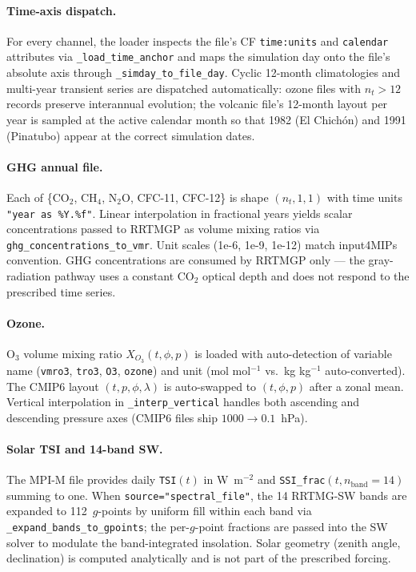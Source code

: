 \documentclass[11pt,twoside]{report}
\begin{document}
\paragraph{Time-axis dispatch.}
For every channel, the loader inspects the file's CF \texttt{time:units}
and \texttt{calendar} attributes via \texttt{\_load\_time\_anchor} and
maps the simulation day onto the file's absolute axis through
\texttt{\_simday\_to\_file\_day}.  Cyclic 12-month climatologies and
multi-year transient series are dispatched automatically:
ozone files with $n_t > 12$ records preserve interannual evolution; the
volcanic file's 12-month layout per year is sampled at the active
calendar month so that 1982 (El Chich\'on) and 1991 (Pinatubo) appear
at the correct simulation dates.

\paragraph{GHG annual file.}
Each of \{CO$_2$, CH$_4$, N$_2$O, CFC-11, CFC-12\} is shape
$(n_t,1,1)$ with time units \texttt{"year as \%Y.\%f"}.  Linear
interpolation in fractional years yields scalar concentrations passed to
RRTMGP as volume mixing ratios via
\texttt{ghg\_concentrations\_to\_vmr}.  Unit scales (1e-6, 1e-9, 1e-12)
match input4MIPs convention.  GHG concentrations are consumed by
RRTMGP only --- the gray-radiation pathway uses a constant CO$_2$
optical depth and does not respond to the prescribed time series.

\paragraph{Ozone.}
$\mathrm{O}_3$ volume mixing ratio $X_{O_3}(t,\phi,p)$ is loaded with
auto-detection of variable name (\texttt{vmro3}, \texttt{tro3},
\texttt{O3}, \texttt{ozone}) and unit (mol mol$^{-1}$ vs.\ kg kg$^{-1}$
auto-converted).  The CMIP6 layout $(t,p,\phi,\lambda)$ is auto-swapped
to $(t,\phi,p)$ after a zonal mean.  Vertical interpolation in
\texttt{\_interp\_vertical} handles both ascending and descending
pressure axes (CMIP6 files ship $1000 \to 0.1$~hPa).

\paragraph{Solar TSI and 14-band SW.}
The MPI-M file provides daily \texttt{TSI}$(t)$ in W~m$^{-2}$ and
\texttt{SSI\_frac}$(t,n_{\mathrm{band}}{=}14)$ summing to one.  When
\texttt{source="spectral\_file"}, the 14 RRTMG-SW bands are expanded to
112~$g$-points by uniform fill within each band via
\texttt{\_expand\_bands\_to\_gpoints}; the per-$g$-point fractions are
passed into the SW solver to modulate the band-integrated insolation.
Solar geometry (zenith angle, declination) is computed analytically and
is not part of the prescribed forcing.
\end{document}
